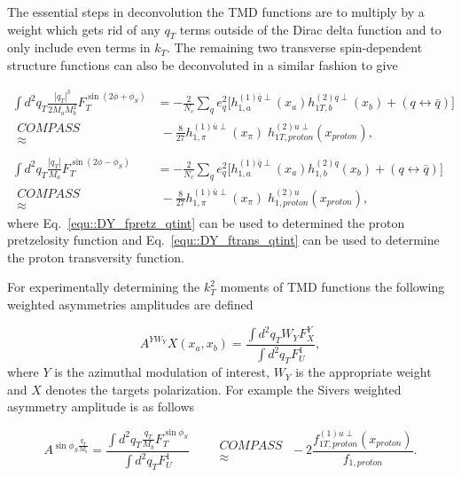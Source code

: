 The essential steps in deconvolution the TMD functions are to multiply by a
weight which gets rid of any ${q_T}$ terms outside of the Dirac delta function
and to only include even terms in $k_T$.  The remaining two transverse
spin-dependent structure functions can also be deconvoluted in a similar fashion
to give

\begin{align}
  \label{equ::DY_fpretz_qtint}
  \int d^2{q_T} \frac{|q_T|^3}{2M_aM_b^2} F_T^{\sin(2\phi+\phi_S)} &=
  - \frac{2}{N_c} \sum_q e_q^2 \Big[
    h_{1,a}^{(1)\bar{q}\perp}(x_a)h_{1T,b}^{(2)q\perp}(x_b) +
    (q\leftrightarrow\bar{q})
    \Big]
  \\ \nonumber
  \substack{COMPASS \\ \approx} & \;
  - \frac{8}{27} h_{1,\pi}^{(1)\bar{u}\perp}(x_{\pi})\;
  h_{1T,proton}^{(2)u\perp}(x_{proton}),
  \\ \nonumber
  \\
  \label{equ::DY_ftrans_qtint}
  \int d^2{q_T} \frac{|q_T|}{M_a} F_T^{\sin(2\phi-\phi_S)} &=
  - \frac{2}{N_c} \sum_q e_q^2 \Big[
    h_{1,a}^{(1)\bar{q}\perp}(x_a)h_{1,b}^{(2)q}(x_b) +
    (q\leftrightarrow\bar{q})
    \Big]
  \\ \nonumber
  \substack{COMPASS \\ \approx} & \;
  - \frac{8}{27} h_{1,\pi}^{(1)\bar{u}\perp}(x_{\pi})\;
  h_{1,proton}^{(2)u}(x_{proton}),
\end{align}
\noindent
where Eq.~\ref{equ::DY_fpretz_qtint} can be used to determined the proton
pretzelosity function and Eq.~\ref{equ::DY_ftrans_qtint} can be used to
determine the proton transversity function.

For experimentally determining the $k_T^2$ moments of TMD functions the
following weighted asymmetries amplitudes are defined

\begin{equation}
  A^{YW_Y}{X}(x_a, x_b) = \frac{\int d^2{q_T} W_YF^Y_X}{\int d^2{q_T} F_U^1},
\end{equation}
\noindent
where $Y$ is the azimuthal modulation of interest, $W_Y$ is the appropriate
weight and $X$ denotes the targets polarization.  For example the Sivers
weighted asymmetry amplitude is as follows

\begin{equation}
  A^{\sin \phi_S \frac{q_T}{M_b}} =
  \frac{\int d^2{q_T} \frac{q_T}{M_b}F^{\sin \phi_S}_T}{\int d^2{q_T} F_U^1}
  \quad\quad \substack{COMPASS \\ \approx} \;
  -2\frac{f_{1T,proton}^{(1)u\perp}(x_{proton})}{f_{1,proton}}.
\end{equation}

